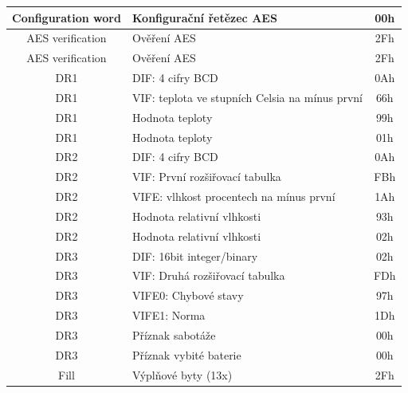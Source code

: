 \begin{table}[!ht]
{\begin{tabular}{|c|l|c|}
Configuration word & Konfigurační řetězec AES                       & 00h              \\ \hline
AES verification   & Ověření AES                                  & 2Fh              \\ \hline
AES verification   & Ověření AES                                  & 2Fh              \\ \hline
DR1                & DIF: 4 cifry BCD                               & 0Ah              \\ \hline
DR1                & VIF: teplota ve stupních Celsia na mínus první & 66h              \\ \hline
DR1                & Hodnota teploty                                & 99h              \\ \hline
DR1                & Hodnota teploty                                & 01h              \\ \hline
DR2                & DIF: 4 cifry BCD                               & 0Ah              \\ \hline
DR2                & VIF: První rozšiřovací tabulka                 & FBh              \\ \hline
DR2                & VIFE: vlhkost procentech na mínus první        & 1Ah              \\ \hline
DR2                & Hodnota relativní vlhkosti                               & 93h              \\ \hline
DR2                & Hodnota relativní vlhkosti                               & 02h              \\ \hline
DR3                & DIF: 16bit integer/binary                      & 02h              \\ \hline
DR3                & VIF: Druhá rozšiřovací tabulka                 & FDh              \\ \hline
DR3                & VIFE0: Chybové stavy                           & 97h              \\ \hline
DR3                & VIFE1: Norma 																	& 1Dh              \\ \hline
DR3                & Příznak sabotáže                               & 00h              \\ \hline
DR3                & Příznak vybité baterie                         & 00h              \\ \hline
Fill               & Výplňové byty (13x)                                 & 2Fh              \\ \hline \hline

\end{tabular}}
\end{table}

